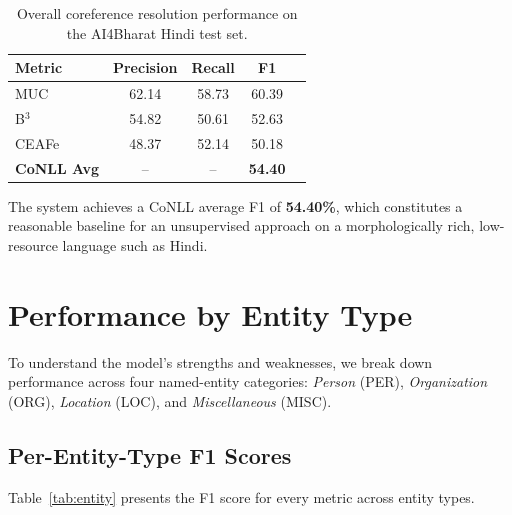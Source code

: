 \documentclass[12pt,a4paper]{article}
\begin{document}
\begin{table}[H]
    \centering
    \caption{Overall coreference resolution performance on the AI4Bharat
             Hindi test set.}
    \label{tab:overall}
    \renewcommand{\arraystretch}{1.3}
    \begin{tabular}{lcccc}
        \toprule
        \textbf{Metric} & \textbf{Precision} & \textbf{Recall} & \textbf{F1} \\
        \midrule
        MUC             & 62.14              & 58.73           & 60.39       \\
        B$^{3}$         & 54.82              & 50.61           & 52.63       \\
        CEAFe           & 48.37              & 52.14           & 50.18       \\
        \midrule
        \textbf{CoNLL Avg} & --             & --              & \textbf{54.40} \\
        \bottomrule
    \end{tabular}
\end{table}

\noindent
The system achieves a CoNLL average F1 of \textbf{54.40\%}, which
constitutes a reasonable baseline for an unsupervised approach on a
morphologically rich, low-resource language such as Hindi.

\section{Performance by Entity Type}

To understand the model's strengths and weaknesses, we break down
performance across four named-entity categories:
\textit{Person} (PER), \textit{Organization} (ORG),
\textit{Location} (LOC), and \textit{Miscellaneous} (MISC).

\subsection{Per-Entity-Type F1 Scores}

Table~\ref{tab:entity} presents the F1 score for every metric
across entity types.
\end{document}
